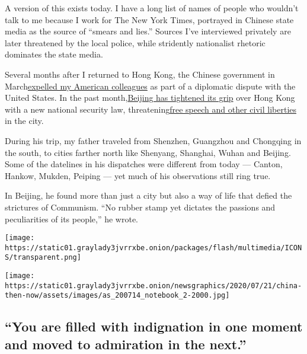 A version of this exists today. I have a long list of names of people
who wouldn't talk to me because I work for The New York Times, portrayed
in Chinese state media as the source of ``smears and lies.'' Sources
I've interviewed privately are later threatened by the local police,
while stridently nationalist rhetoric dominates the state media.

Several months after I returned to Hong Kong, the Chinese government in
March\href{https://www.nytimes3xbfgragh.onion/2020/03/18/world/asia/china-expels-journalists.html}{}\href{https://www.nytimes3xbfgragh.onion/2020/03/18/world/asia/china-expels-journalists.html}{expelled
my American colleagues} as part of a diplomatic dispute with the United
States. In the past
month,\href{https://www.nytimes3xbfgragh.onion/2020/06/29/world/asia/china-hong-kong-security-law-rules.html?action=click\&module=RelatedLinks\&pgtype=Article}{}\href{https://www.nytimes3xbfgragh.onion/2020/06/29/world/asia/china-hong-kong-security-law-rules.html?action=click\&module=RelatedLinks\&pgtype=Article}{Beijing
has tightened its grip} over Hong Kong with a new national security law,
threatening\href{https://www.nytimes3xbfgragh.onion/2020/07/01/world/asia/hong-kong-security-law-china.html}{}\href{https://www.nytimes3xbfgragh.onion/2020/07/01/world/asia/hong-kong-security-law-china.html}{free
speech and other civil liberties} in the city.

During his trip, my father traveled from Shenzhen, Guangzhou and
Chongqing in the south, to cities farther north like Shenyang, Shanghai,
Wuhan and Beijing. Some of the datelines in his dispatches were
different from today --- Canton, Hankow, Mukden, Peiping --- yet much of
his observations still ring true.

In Beijing, he found more than just a city but also a way of life that
defied the strictures of Communism. ``No rubber stamp yet dictates the
passions and peculiarities of its people,'' he wrote.

\texttt{[image: https://static01.graylady3jvrrxbe.onion/packages/flash/multimedia/ICONS/transparent.png]}

\texttt{[image: https://static01.graylady3jvrrxbe.onion/newsgraphics/2020/07/21/china-then-now/assets/images/as\_200714\_notebook\_2-2000.jpg]}

\hypertarget{you-are-filled-with-indignation-in-one-moment-and-moved-to-admiration-in-the-next}{%
\subsection{``You are filled with indignation in one moment and moved to
admiration in the
next.''}\label{you-are-filled-with-indignation-in-one-moment-and-moved-to-admiration-in-the-next}}

